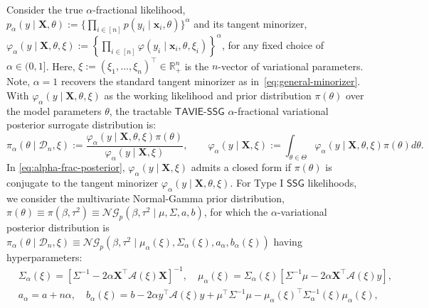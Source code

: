 \documentclass[12pt]{article}
\numberwithin{equation}{section}
\newcommand{\ssg}{\mathsf{SSG}}
\newcommand{\tssg}{\mathsf{TAVIE}\text{-}\mathsf{SSG}}
\begin{document}
Consider the {true} $\alpha$-fractional likelihood, $p_{\alpha}(y \mid \mathbf{X}, \theta) := \{\prod_{i \in [n]} p(y_i \mid \mathbf{x}_i, \theta)\}^\alpha$ and its tangent minorizer, $\varphi_{\alpha}(y \mid \mathbf{X}, \theta, \xi) := \left\{\prod_{i\in [n]} \varphi(y_i \mid \mathbf{x}_i, \theta, \xi_i)\right\}^{\alpha}$, for any fixed choice of $\alpha \in (0, 1]$. Here, $\xi := (\xi_1, \ldots, \xi_n)^{\top}\in \mathbb{R}_{+}^{n}$ is the $n$-vector of variational parameters. Note, $\alpha=1$ recovers the standard tangent minorizer as in~\eqref{eq:general-minorizer}. With $\varphi_{\alpha}(y\mid \mathbf{X}, \theta, \xi)$ as the {working likelihood} and prior distribution $\pi(\theta)$ over the model parameters $\theta$, the tractable $\tssg$ $\alpha$-fractional variational posterior surrogate distribution is:
%
\begin{equation}\label{eq:alpha-frac-posterior}
\pi_{\alpha}(\theta \mid \mathcal{D}_n, \xi) := \frac{\varphi_{\alpha}(y \mid \mathbf{X}, \theta, \xi) \pi(\theta)}{\varphi_{\alpha}(y \mid \mathbf{X}, \xi)},
\qquad \varphi_{\alpha}(y \mid \mathbf{X}, \xi) := \int_{\theta \in \Theta} \varphi_{\alpha}(y \mid \mathbf{X}, \theta, \xi) \pi(\theta) d\theta.
\end{equation}
%
In \eqref{eq:alpha-frac-posterior}, $\varphi_{\alpha}(y \mid \mathbf{X}, \xi)$ admits a closed form if $\pi(\theta)$ is conjugate to the tangent minorizer $\varphi_{\alpha}(y \mid \mathbf{X}, \theta, \xi)$. 
For Type I $\ssg$ likelihoods, we consider the {multivariate Normal-Gamma} prior distribution, $\pi(\theta) \equiv \pi(\beta, \tau^2) \equiv \mathcal{NG}_p(\beta, \tau^2 \mid \mu, \Sigma, a,b)$, for which the $\alpha$-variational posterior distribution is $\pi_{\alpha}(\theta \mid \mathcal{D}_n, \xi) \equiv \mathcal{NG}_p(\beta, \tau^2 \mid \mu_{\alpha}(\xi), \Sigma_{\alpha}(\xi), a_{\alpha},b_{\alpha}(\xi))$ having hyperparameters:
%
\begin{equation}\label{eq:typeI-variational-hyperparameters}
\begin{split}
&\Sigma_{\alpha}(\xi) = \left[\Sigma^{-1} -2\alpha\mathbf{X}^{\top}\mathcal{A}(\xi)\mathbf{X}\right]^{-1},\quad \mu_{\alpha}(\xi) = \Sigma_{\alpha}(\xi)\left[\Sigma^{-1}\mu - 2\alpha\mathbf{X}^{\top}\mathcal{A}(\xi)y\right],\\
&a_{\alpha} = a + n\alpha,\quad b_{\alpha}(\xi) = b - 2\alpha y^{\top}\mathcal{A}(\xi)y + \mu^{\top} \Sigma^{-1} \mu - \mu_{\alpha}(\xi)^{\top} \Sigma^{-1}_{\alpha}(\xi) \mu_{\alpha}(\xi),
\end{split}    
\end{equation}
\end{document}
